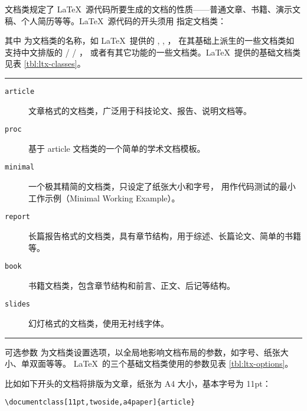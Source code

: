 文档类规定了 \LaTeX\ 源代码所要生成的文档的性质——普通文章、书籍、演示文稿、个人简历等等。\LaTeX\ 源代码的开头须用
指定文档类：
\begin{command}
\end{command}

其中  为文档类的名称，如 \LaTeX\ 提供的 , , ，
在其基础上派生的一些文档类如支持中文排版的  /  / ，
或者有其它功能的一些文档类。\LaTeX\ 提供的基础文档类见表 \ref{tbl:ltx-classes}。

\begin{table}[!hbp]
\caption{\LaTeX\ 提供的基础文档类}\label{tbl:ltx-classes}
\hrule
\begin{flushleft}
\begin{description}
  \item [\normalfont\texttt{article}] 文章格式的文档类，广泛用于科技论文、报告、说明文档等。
  \item [\normalfont\texttt{proc}] 基于 article 文档类的一个简单的学术文档模板。
  \item [\normalfont\texttt{minimal}] 一个极其精简的文档类，只设定了纸张大小和字号，
  用作代码测试的最小工作示例（Minimal Working Example）。
  \item [\normalfont\texttt{report}] 长篇报告格式的文档类，具有章节结构，用于综述、长篇论文、简单的书籍等。
  \item [\normalfont\texttt{book}] 书籍文档类，包含章节结构和前言、正文、后记等结构。
  \item [\normalfont\texttt{slides}] 幻灯格式的文档类，使用无衬线字体。
\end{description}
\end{flushleft}
\hrule
\end{table}

可选参数  为文档类设置选项，以全局地影响文档布局的参数，如字号、纸张大小、单双面等等。
\LaTeX\ 的三个基础文档类使用的参数见表 \ref{tbl:ltx-options}。

比如如下开头的文档将排版为文章，纸张为 A4 大小，基本字号为 11pt：
\begin{verbatim}
\documentclass[11pt,twoside,a4paper]{article}
\end{verbatim}

